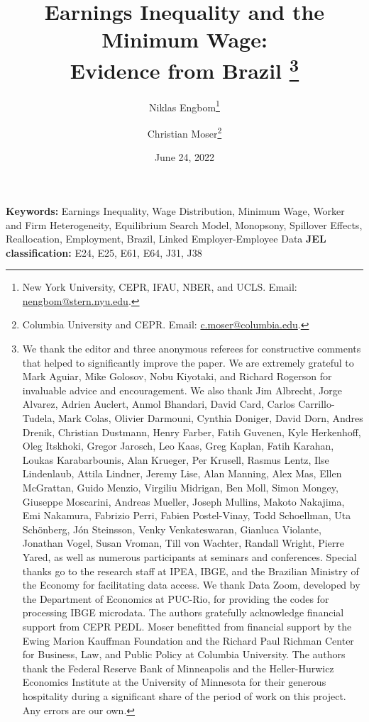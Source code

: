 \documentclass[%
  11pt,%
  american,%
  english,%
  letterpaper%
  ]%
  {article}
\theoremstyle{plain}
\theoremstyle{definition}
\theoremstyle{plain}
\theoremstyle{plain}
\begin{document}
\title{%
  Earnings Inequality and the Minimum Wage:\\ Evidence from Brazil%
  \thanks{%
    We thank the editor and three anonymous referees for constructive comments that helped to significantly improve the paper. %
    We are extremely grateful to Mark Aguiar, Mike Golosov, Nobu Kiyotaki, and Richard Rogerson for invaluable advice
    and encouragement. %
    We also thank Jim Albrecht, Jorge Alvarez,
    Adrien Auclert, Anmol Bhandari, David Card, Carlos Carrillo-Tudela,
    Mark Colas, Olivier Darmouni, Cynthia Doniger, David Dorn, Andres
    Drenik, Christian Dustmann, Henry Farber, Fatih Guvenen,
    Kyle Herkenhoff, Oleg Itskhoki, Gregor Jarosch, Leo Kaas, Greg Kaplan,
    Fatih Karahan, Loukas Karabarbounis, Alan Krueger,
    Per Krusell, Rasmus Lentz, Ilse Lindenlaub, Attila Lindner, Jeremy
    Lise, Alan Manning, Alex Mas, Ellen McGrattan, Guido Menzio, Virgiliu
    Midrigan, Ben Moll, Simon Mongey, Giuseppe Moscarini, Andreas Mueller,
    Joseph Mullins, Makoto Nakajima, Emi Nakamura, Fabrizio Perri, Fabien
    Postel-Vinay, Todd Schoellman, Uta Sch{\"{o}}nberg, J{\'{o}}n Steinsson,
    Venky Venkateswaran, Gianluca Violante, Jonathan Vogel, Susan Vroman,
    Till von Wachter, Randall Wright, Pierre Yared, as well as numerous
    participants at seminars and conferences. %
    Special thanks go to the research staff at IPEA, IBGE, and the Brazilian Ministry of the Economy for facilitating data access.
    We thank Data Zoom, developed by the Department of Economics at PUC-Rio,
    for providing the codes for processing IBGE microdata. %
    The authors gratefully acknowledge financial support from CEPR PEDL. Moser benefitted
    from financial support by the Ewing Marion Kauffman Foundation and
    the Richard Paul Richman Center for Business, Law, and Public Policy
    at Columbia University. %
    The authors thank the Federal Reserve Bank of Minneapolis and the Heller-Hurwicz Economics Institute at the University of Minnesota for their generous hospitality during a significant share of the period of work on this project. %
    Any errors are our own.%
    }%
}
%
\date{June 24, 2022}
%
\author{%
Niklas Engbom\thanks{New York University, CEPR, IFAU, NBER, and UCLS. Email: \href{mailto:nengbom@stern.nyu.edu}{nengbom@stern.nyu.edu}.}%
%
\\ \and %
%
Christian Moser\thanks{Columbia University and CEPR. Email: \href{mailto:c.moser@columbia.edu}{c.moser@columbia.edu}.}
}
%
\maketitle
%

%
\noindent\textbf{\small{}Keywords:}{\small{} Earnings Inequality, Wage Distribution, Minimum Wage, Worker and Firm Heterogeneity, Equilibrium Search Model, Monopsony, Spillover Effects, Reallocation, Employment, Brazil, Linked Employer-Employee Data}
%
\noindent\textbf{\small{}JEL classification:}{\small{} E24, E25, E61, E64, J31, J38}{\small\par}
%
\clearpage
\end{document}

